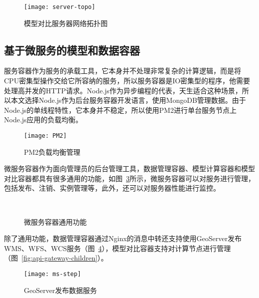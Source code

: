 \begin{figure}[!htbp]
    \centering
    \texttt{[image: server-topo]}
    \caption{模型对比服务器网络拓扑图}
    \label{fig:server-topo}
\end{figure}

\subsection{基于微服务的模型和数据容器}
服务容器作为服务的承载工具，它本身并不处理非常复杂的计算逻辑，而是将CPU密集型操作交给它所容纳的服务，所以服务容器是IO密集型的程序，他需要处理高并发的HTTP请求。Node.js作为异步编程的代表，天生适合这种场景，所以本文选择Node.js作为后台服务容器开发语言，使用MongoDB管理数据。由于Node.js的单线程特性，它本身并不稳定，所以使用PM2进行单台服务节点上Node.js应用的负载均衡。

\begin{figure}[!htbp]
    \centering
    \texttt{[image: PM2]}
    \caption{PM2负载均衡管理}
    \label{fig:ms-LB}
\end{figure}

微服务容器作为面向管理员的后台管理工具，数据管理容器、模型计算容器和模型对比容器都具有很多通用的功能，如图~\ref{fig:service-container-common-fn}所示，微服务容器可以对服务进行管理，包括发布、注销、实例管理等，此外，还可以对服务器性能进行监控。

\begin{figure}[!htbp]
    \centering
    \hfill
     \\
    \hfill
    \caption{微服务容器通用功能}
    \label{fig:service-container-common-fn}
\end{figure}

除了通用功能，数据管理容器通过Nginx的消息中转还支持使用GeoServer发布WMS、WFS、WCS服务（图~\ref{fig:geoserver}），模型对比容器支持对计算节点进行管理（图~\ref{fig:api-gateway-children}）。

\begin{figure}[!htbp]
    \centering
    \texttt{[image: ms-step]}
    \caption{GeoServer发布数据服务}
    \label{fig:geoserver}
\end{figure}

